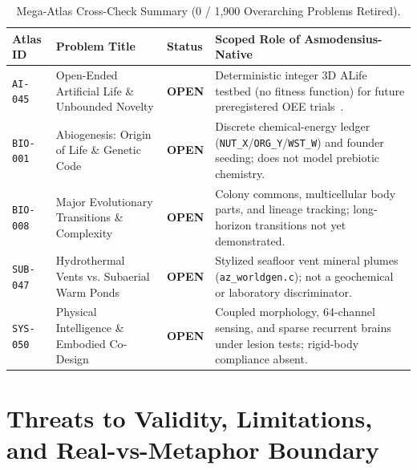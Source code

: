 \documentclass[11pt,reqno]{amsart}
\newcommand{\code}[1]{\texttt{\footnotesize #1}}
\newcommand{\us}{\_\allowbreak}
\begin{document}
\begin{table}[htbp]
\centering
\caption{Mega-Atlas Cross-Check Summary (0 / 1,900 Overarching Problems Retired).}
\label{tab:atlas}
\footnotesize
\setlength{\tabcolsep}{4pt}
\begin{tabularx}{\textwidth}{L{1.4cm}L{3.3cm}L{1.45cm}Y}
\toprule
\textbf{Atlas ID} & \textbf{Problem Title} & \textbf{Status} & \textbf{Scoped Role of Asmodensius-Native} \\
\midrule
\code{AI-045} & Open-Ended Artificial Life \& Unbounded Novelty & \textbf{OPEN} & Deterministic integer 3D ALife testbed (no fitness function) for future preregistered OEE trials~\cite{taylor2016open,packard2019overview}. \\
\code{BIO-001} & Abiogenesis: Origin of Life \& Genetic Code & \textbf{OPEN} & Discrete chemical-energy ledger (\code{NUT\us X}/\code{ORG\us Y}/\code{WST\us W}) and founder seeding; does not model prebiotic chemistry. \\
\code{BIO-008} & Major Evolutionary Transitions \& Complexity & \textbf{OPEN} & Colony commons, multicellular body parts, and lineage tracking; long-horizon transitions not yet demonstrated. \\
\code{SUB-047} & Hydrothermal Vents vs. Subaerial Warm Ponds & \textbf{OPEN} & Stylized seafloor vent mineral plumes (\code{az\us worldgen.c}); not a geochemical or laboratory discriminator. \\
\code{SYS-050} & Physical Intelligence \& Embodied Co-Design & \textbf{OPEN} & Coupled morphology, 64-channel sensing, and sparse recurrent brains under lesion tests; rigid-body compliance absent. \\
\bottomrule
\end{tabularx}
\end{table}

\section{Threats to Validity, Limitations, and Real-vs-Metaphor Boundary}
\end{document}
